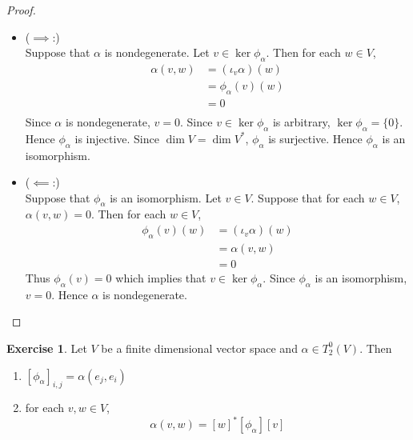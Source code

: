 \documentclass{book}
\theoremstyle{definition}
\newtheorem{ex}[definition]{Exercise}
\newcommand{\al}{\alpha}
\DeclareMathOperator*{\0}{\mbf{0}}
\DeclareMathOperator*{\1}{\mbf{1}}
\begin{document}
	\begin{proof}\
		\begin{itemize}
			\item ($\implies$:) \\
			Suppose that $\al$ is nondegenerate. Let $v \in \ker \phi_{\al}$. Then for each $w \in V$,
			\begin{align*}
				\al(v, w) 
				& = (\iota_v \al) (w) \\
				& = \phi_{\al}(v)(w) \\
				& = 0 \\
			\end{align*}
			Since $\al$ is nondegenerate, $v = 0$. Since $v \in \ker \phi_{\al}$ is arbitrary, $\ker \phi_{\al} = \{0\}$. Hence $\phi_{\al}$ is injective. Since $\dim V = \dim V^*$, $\phi_{\al}$ is surjective. Hence $\phi_{\al}$ is an isomorphism.   
			\item ($\impliedby$:) \\
			Suppose that $\phi_{\al}$ is an isomorphism. Let $v \in V$. Suppose that for each $w \in V$, $\al(v, w) = 0$. Then for each $w \in V$,
			\begin{align*}
				\phi_{\al}(v)(w)
				& = (\iota_v \al) (w) \\
				& = \al(v, w) \\
				& = 0
			\end{align*}
			Thus $\phi_{\al}(v) = 0$ which implies that $v \in \ker \phi_{\al}$. Since $\phi_{\al}$ is an isomorphism, $v = 0$. Hence $\al$ is nondegenerate. 
		\end{itemize}
	\end{proof}

	\begin{ex}
		Let $V$ be a finite dimensional vector space and $\al \in T^0_2(V)$. Then
		\begin{enumerate}
			\item $[\phi_{\al}]_{i,j} = \al(e_j, e_i)$
			\item for each $v, w \in V$, 
			$$\al(v, w) = [w]^*[\phi_{\al}] [v]$$
		\end{enumerate}
	\end{ex}
	
\end{document}
